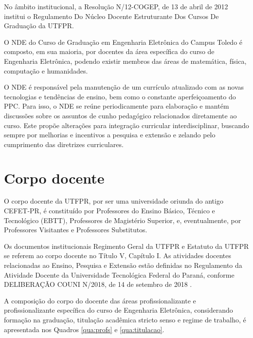  No âmbito institucional, a Resolução N/12-COGEP, de 13 de abril de 2012 \cite{cogep9} institui o Regulamento Do Núcleo Docente Estruturante Dos Cursos De Graduação da UTFPR.

O NDE do Curso de Graduação em Engenharia Eletrônica do Campus Toledo é composto, em sua maioria, por docentes da área específica do curso de Engenharia Eletrônica, podendo existir membros das áreas de matemática, física, computação e humanidades. 

O NDE é responsável pela manutenção de um currículo atualizado com as novas tecnologias e tendências de ensino, bem como o constante aperfeiçoamento do PPC. Para isso, o NDE se reúne periodicamente para elaboração e mantém discussões sobre os assuntos de cunho pedagógico relacionados diretamente ao curso. Este propõe alterações para integração curricular interdisciplinar, buscando sempre por melhorias e incentivos a pesquisa e extensão e zelando pelo cumprimento das diretrizes curriculares.


\section{Corpo docente}

O corpo docente da UTFPR, por ser uma universidade oriunda do antigo CEFET-PR, é constituído por Professores do Ensino Básico, Técnico e Tecnológico (EBTT), Professores de Magistério Superior, e, eventualmente, por Professores Visitantes e Professores Substitutos.

Os documentos institucionais Regimento Geral da UTFPR e Estatuto da UTFPR \cite{estatutoutfpr} se referem ao corpo docente no Título V, Capítulo I. As atividades docentes relacionadas ao Ensino, Pesquisa e Extensão estão definidas no Regulamento da Atividade Docente da Universidade Tecnológica Federal do Paraná, conforme DELIBERAÇÃO COUNI N/2018, de 14 de setembro de 2018 \cite{couni25}. 

A composição do corpo do docente das áreas profissionalizante e profissionalizante específica do curso de Engenharia Eletrônica, considerando formação na graduação, titulação acadêmica stricto senso e regime de trabalho, é apresentada nos Quadros \ref{qua:profs} e \ref{qua:titulacao}.

